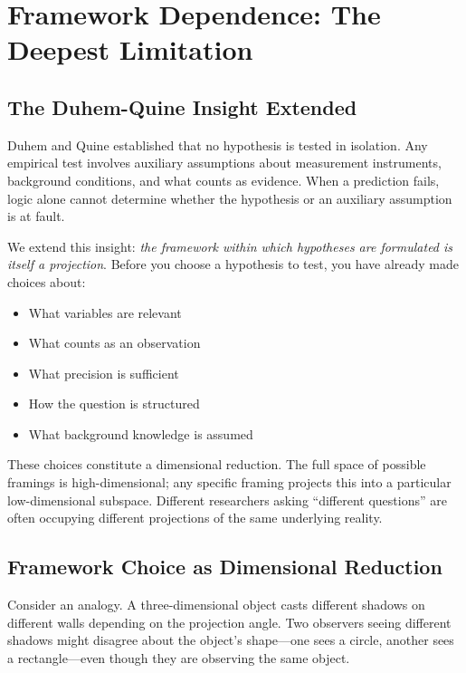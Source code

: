 \documentclass[12pt]{article}
\begin{document}
\section{Framework Dependence: The Deepest Limitation}

\subsection{The Duhem-Quine Insight Extended}

Duhem \cite{duhem1906} and Quine \cite{quine1951} established that no hypothesis is tested in isolation. Any empirical test involves auxiliary assumptions about measurement instruments, background conditions, and what counts as evidence. When a prediction fails, logic alone cannot determine whether the hypothesis or an auxiliary assumption is at fault.

We extend this insight: \emph{the framework within which hypotheses are formulated is itself a projection}. Before you choose a hypothesis to test, you have already made choices about:

\begin{itemize}
\item What variables are relevant
\item What counts as an observation
\item What precision is sufficient
\item How the question is structured
\item What background knowledge is assumed
\end{itemize}

These choices constitute a dimensional reduction. The full space of possible framings is high-dimensional; any specific framing projects this into a particular low-dimensional subspace. Different researchers asking ``different questions'' are often occupying different projections of the same underlying reality.

\subsection{Framework Choice as Dimensional Reduction}

Consider an analogy. A three-dimensional object casts different shadows on different walls depending on the projection angle. Two observers seeing different shadows might disagree about the object's shape---one sees a circle, another sees a rectangle---even though they are observing the same object.
\end{document}
